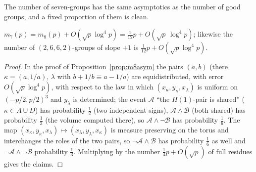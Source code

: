 The number of seven-groups has the same asymptotics as the number of good groups, and a fixed proportion of them is clean.

\begin{proposition}\label{prop:m7asym}
$m_7(p)=m_8(p)+O(\sqrt p\log^4p)=\tfrac1{12}p+O(\sqrt p\,\log^4p)$; likewise the number of $(2,6,6,2)$-groups of slope $+1$ is
$\tfrac1{12}p+O(\sqrt p\log^4p)$.
\end{proposition}
\begin{proof}
In the proof of Proposition~\ref{prop:m8asym} the pairs $(a,b)$ (there $\kappa=(a,1/a)$, $\lambda$ with $b+1/b\equiv a-1/a$) are
equidistributed, with error $O(\sqrt p\log^4p)$, with respect to the law in which $(x_\kappa,y_\kappa,x_\lambda)$ is uniform on
$(-p/2,p/2)^3$ and $y_\lambda$ is determined; the event $\mathcal A$ ``the $H(1)$-pair is shared'' ($\kappa\in A\cup D$) has probability
$\tfrac12$ (two independent signs), $\mathcal A\wedge\mathcal B$ (both shared) has probability $\tfrac13$ (the volume computed there), so
$\mathcal A\wedge\neg\mathcal B$ has probability $\tfrac16$.  The map $(x_\kappa,y_\kappa,x_\lambda)\mapsto(x_\lambda,y_\lambda,x_\kappa)$ is
measure preserving on the torus and interchanges the roles of the two pairs, so $\neg\mathcal A\wedge\mathcal B$ has probability $\tfrac16$
as well and $\neg\mathcal A\wedge\neg\mathcal B$ probability $\tfrac13$.  Multiplying by the number $\tfrac14p+O(\sqrt p)$ of full residues
gives the claims.
\end{proof}

